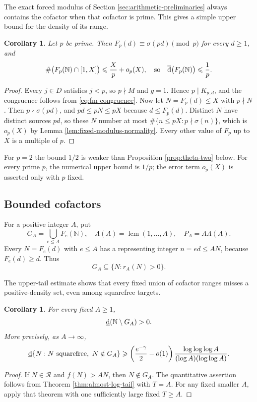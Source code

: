 \documentclass[11pt,letterpaper,reqno]{amsart}
\numberwithin{equation}{section}
\newtheorem{corollary}[theorem]{Corollary}
\theoremstyle{remark}
\newcommand{\N}{\mathbb{N}}
\newcommand{\Rcal}{\mathcal{R}}
\newcommand{\1}{\mathbf 1}
\newcommand{\lowerdens}{\underline{\textup{d}}}
\newcommand{\upperdens}{\overline{\textup{d}}}
\DeclareMathOperator{\lcm}{lcm}
\renewcommand{\leq}{\leqslant}
\renewcommand{\geq}{\geqslant}
\begin{document}
The exact forced modulus of Section \ref{sec:arithmetic-preliminaries} always
contains the cofactor when that cofactor is prime. This gives a simple
upper bound for the density of its range.
\begin{corollary}
Let $p$ be prime. Then $F_p(d)\equiv\sigma(pd)\pmod p$ for every $d\geq1$,
and
\[
 \#\bigl(F_p(\N)\cap[1,X]\bigr)\leq\frac Xp+o_p(X),
 \quad\text{so}\quad
 \upperdens\bigl(F_p(\N)\bigr)\leq\frac1p .
\]
\end{corollary}
\begin{proof}
Every $j\in D$ satisfies $j<p$, so $p\nmid M$ and $g=1$. Hence
$p\mid K_{p,d}$, and the congruence follows from \eqref{eq:fm-congruence}.
Now let $N=F_p(d)\leq X$ with $p\nmid N$. Then $p\nmid\sigma(pd)$, and
$pd\leq pN\leq pX$ because $d\leq F_p(d)$. Distinct $N$ have distinct
sources $pd$, so these $N$ number at most
$\#\{n\leq pX:p\nmid\sigma(n)\}$, which is $o_p(X)$ by
Lemma \ref{lem:fixed-modulus-normality}. Every other value of $F_p$ up to
$X$ is a multiple of $p$.
\end{proof}
For $p=2$ the bound $1/2$ is weaker than Proposition \ref{prop:theta-two}
below. For every prime $p$, the numerical upper bound is $1/p$; the error term
$o_p(X)$ is asserted only with $p$ fixed.

\subsection{Bounded cofactors}

For a positive integer $A$, put
\[
 G_A=\bigcup_{e\leq A}F_e(\N),\quad
 \Lambda(A)=\lcm(1,\ldots,A),\quad P_A=A\Lambda(A).
\]
Every $N=F_e(d)$ with
$e\leq A$ has a representing integer $n=ed\leq AN$, because $F_e(d)\geq d$.
Thus
\[
 G_A\subseteq\{N:r_A(N)>0\}.
\]

The upper-tail estimate shows that every fixed union of cofactor ranges misses a positive-density set, even among squarefree targets.

\begin{corollary}
For every fixed $A\geq1$,
\[
 \lowerdens(\N\setminus G_A)>0.
\]
More precisely, as $A\to\infty$,
\begin{equation}\label{eq:fixed-cofactor-defect}
 \lowerdens\{N:N\text{ squarefree},\ N\notin G_A\}
 \geq\left(\frac{e^{-\gamma}}2-o(1)\right)
 \frac{\log\log\log A}{(\log A)(\log\log A)}.
\end{equation}
\end{corollary}

\begin{proof}
If $N\in\Rcal$ and $f(N)>AN$, then $N\notin G_A$. The quantitative
assertion follows from Theorem \ref{thm:almost-log-tail} with $T=A$.
For any fixed smaller $A$, apply that theorem with one sufficiently large
fixed $T\geq A$.
\end{proof}
\end{document}

